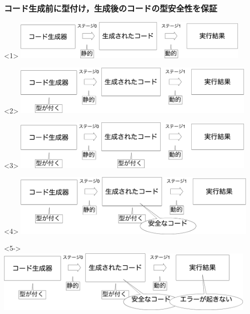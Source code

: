 \begin{frame}
  \frametitle{コード生成前に型付け，生成後のコードの型安全性を保証}
  \begin{onlyenv}<1>
    \center
    \includegraphics[clip,height=1.9cm]{./img/prggen.png}
  \end{onlyenv}

  \begin{onlyenv}<2>
    \center
    \includegraphics[clip,height=2.4cm]{./img/prggen_type1.png}
  \end{onlyenv}

  \begin{onlyenv}<3>
    \center
    \includegraphics[clip,height=2.4cm]{./img/prggen_type2.png}
  \end{onlyenv}

  \begin{onlyenv}<4>
    \center
    \includegraphics[clip,height=3.0cm]{./img/prggen_type3.png}
  \end{onlyenv}

  \begin{onlyenv}<5->
    \center
    \includegraphics[clip,height=3.0cm]{./img/prggen_type4.png}
  \end{onlyenv}


\end{frame}
